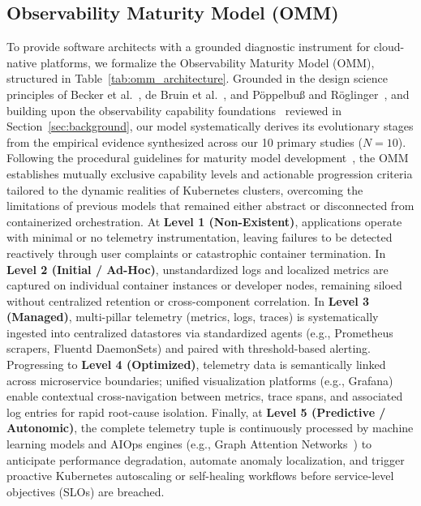\documentclass[sigconf, anonymous, balance=false]{acmart}
\begin{document}
\subsection{Observability Maturity Model (OMM)}



To provide software architects with a grounded diagnostic instrument for cloud-native platforms, we formalize the Observability Maturity Model (OMM), structured in Table~\ref{tab:omm_architecture}. Grounded in the design science principles of Becker et al.~\cite{becker_2009}, de Bruin et al.~\cite{debruin_2005}, and Pöppelbuß and Röglinger~\cite{poppelbuss_2011}, and building upon the observability capability foundations~\cite{valbusa_2025, agarwal_2022, nethala_2025, patel_2025} reviewed in Section~\ref{sec:background}, our model systematically derives its evolutionary stages from the empirical evidence synthesized across our 10 primary studies ($N = 10$). Following the procedural guidelines for maturity model development~\cite{becker_2009, wendler_2012}, the OMM establishes mutually exclusive capability levels and actionable progression criteria tailored to the dynamic realities of Kubernetes clusters, overcoming the limitations of previous models that remained either abstract or disconnected from containerized orchestration. At \textbf{Level 1 (Non-Existent)}, applications operate with minimal or no telemetry instrumentation, leaving failures to be detected reactively through user complaints or catastrophic container termination. In \textbf{Level 2 (Initial / Ad-Hoc)}, unstandardized logs and localized metrics are captured on individual container instances or developer nodes, remaining siloed without centralized retention or cross-component correlation. In \textbf{Level 3 (Managed)}, multi-pillar telemetry (metrics, logs, traces) is systematically ingested into centralized datastores via standardized agents (e.g., Prometheus scrapers, Fluentd DaemonSets) and paired with threshold-based alerting. Progressing to \textbf{Level 4 (Optimized)}, telemetry data is semantically linked across microservice boundaries; unified visualization platforms (e.g., Grafana) enable contextual cross-navigation between metrics, trace spans, and associated log entries for rapid root-cause isolation. Finally, at \textbf{Level 5 (Predictive / Autonomic)}, the complete telemetry tuple is continuously processed by machine learning models and AIOps engines (e.g., Graph Attention Networks~\cite{han_2024}) to anticipate performance degradation, automate anomaly localization, and trigger proactive Kubernetes autoscaling or self-healing workflows before service-level objectives (SLOs) are breached.
\end{document}
